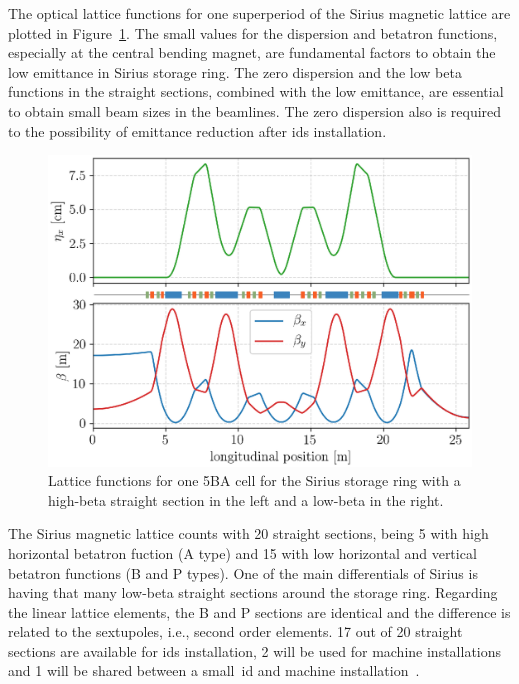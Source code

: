 The optical lattice functions for one superperiod of the Sirius magnetic lattice are plotted in Figure~\ref{fig:twiss_functions}. The small values for the dispersion and betatron functions, especially at the central bending magnet, are fundamental factors to obtain the low emittance in Sirius storage ring. The zero dispersion and the low beta functions in the straight sections, combined with the low emittance, are essential to obtain small beam sizes in the beamlines. The zero dispersion also is required to the possibility of emittance reduction after \glspl{id} installation.
\begin{figure}
    \centering
    \includegraphics[width=1.0\textwidth]{figures/twiss_plot_refine_lattice_grid.eps}
    \caption{Lattice functions for one 5BA cell for the Sirius storage ring with a high-beta straight section in the left and a low-beta in the right.}
    \label{fig:twiss_functions}
\end{figure}

The Sirius magnetic lattice counts with 20 straight sections, being 5 with high horizontal betatron fuction (A type) and 15 with low horizontal and vertical betatron functions (B and P types). One of the main differentials of Sirius is having that many low-beta straight sections around the storage ring. Regarding the linear lattice elements, the B and P sections are identical and the difference is related to the sextupoles, i.e., second order elements. 17 out of 20 straight sections are available for \glspl{id} installation, 2 will be used for machine installations and 1 will be shared between a small~\gls{id} and machine installation~\cite{liu2019}. 

